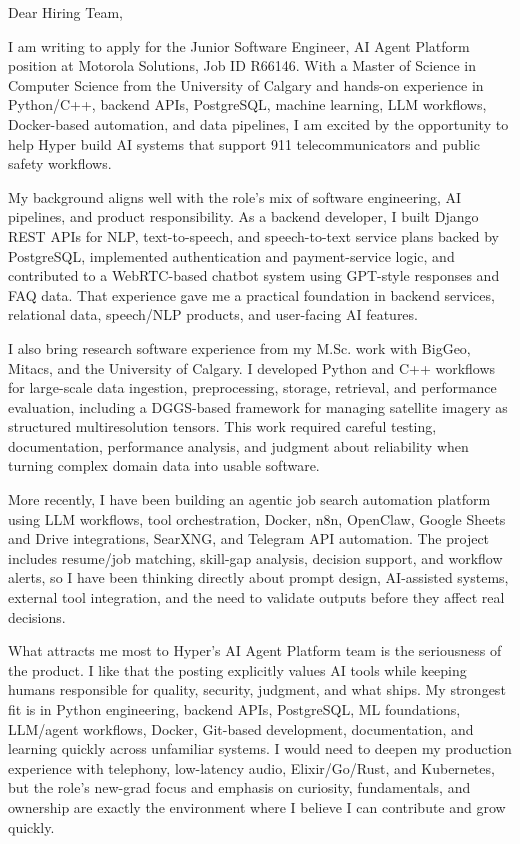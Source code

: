 \documentclass[11pt]{letter}
\begin{document}
\begin{letter}{}

\opening{Dear Hiring Team,}

I am writing to apply for the Junior Software Engineer, AI Agent Platform position at Motorola Solutions, Job ID R66146. With a Master of Science in Computer Science from the University of Calgary and hands-on experience in Python/C++, backend APIs, PostgreSQL, machine learning, LLM workflows, Docker-based automation, and data pipelines, I am excited by the opportunity to help Hyper build AI systems that support 911 telecommunicators and public safety workflows.

My background aligns well with the role's mix of software engineering, AI pipelines, and product responsibility. As a backend developer, I built Django REST APIs for NLP, text-to-speech, and speech-to-text service plans backed by PostgreSQL, implemented authentication and payment-service logic, and contributed to a WebRTC-based chatbot system using GPT-style responses and FAQ data. That experience gave me a practical foundation in backend services, relational data, speech/NLP products, and user-facing AI features.

I also bring research software experience from my M.Sc. work with BigGeo, Mitacs, and the University of Calgary. I developed Python and C++ workflows for large-scale data ingestion, preprocessing, storage, retrieval, and performance evaluation, including a DGGS-based framework for managing satellite imagery as structured multiresolution tensors. This work required careful testing, documentation, performance analysis, and judgment about reliability when turning complex domain data into usable software.

More recently, I have been building an agentic job search automation platform using LLM workflows, tool orchestration, Docker, n8n, OpenClaw, Google Sheets and Drive integrations, SearXNG, and Telegram API automation. The project includes resume/job matching, skill-gap analysis, decision support, and workflow alerts, so I have been thinking directly about prompt design, AI-assisted systems, external tool integration, and the need to validate outputs before they affect real decisions.

What attracts me most to Hyper's AI Agent Platform team is the seriousness of the product. I like that the posting explicitly values AI tools while keeping humans responsible for quality, security, judgment, and what ships. My strongest fit is in Python engineering, backend APIs, PostgreSQL, ML foundations, LLM/agent workflows, Docker, Git-based development, documentation, and learning quickly across unfamiliar systems. I would need to deepen my production experience with telephony, low-latency audio, Elixir/Go/Rust, and Kubernetes, but the role's new-grad focus and emphasis on curiosity, fundamentals, and ownership are exactly the environment where I believe I can contribute and grow quickly.


\end{letter}
\end{document}
